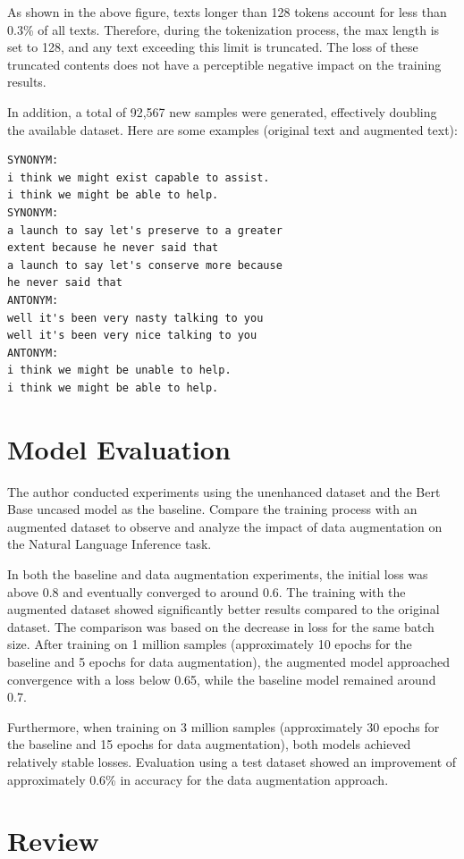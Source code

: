 \documentclass[11pt]{article}
\begin{document}
As shown in the above figure, texts longer than 128 tokens account for less than 0.3\% of all texts. Therefore, during the tokenization process, the max length is set to 128, and any text exceeding this limit is truncated. The loss of these truncated contents does not have a perceptible negative impact on the training results.

In addition, a total of 92,567 new samples were generated, effectively doubling the available dataset. Here are some examples (original text and augmented text):

\begin{verbatim}
SYNONYM:
i think we might exist capable to assist.
i think we might be able to help.
SYNONYM:
a launch to say let's preserve to a greater
extent because he never said that
a launch to say let's conserve more because
he never said that
ANTONYM:
well it's been very nasty talking to you
well it's been very nice talking to you
ANTONYM:
i think we might be unable to help.
i think we might be able to help.
\end{verbatim}


\section{Model Evaluation}

The author conducted experiments using the unenhanced dataset and the Bert Base uncased model as the baseline. Compare the training process with an augmented dataset to observe and analyze the impact of data augmentation on the Natural Language Inference task.

In both the baseline and data augmentation experiments, the initial loss was above 0.8 and eventually converged to around 0.6. The training with the augmented dataset showed significantly better results compared to the original dataset. The comparison was based on the decrease in loss for the same batch size. After training on 1 million samples (approximately 10 epochs for the baseline and 5 epochs for data augmentation), the augmented model approached convergence with a loss below 0.65, while the baseline model remained around 0.7.

Furthermore, when training on 3 million samples (approximately 30 epochs for the baseline and 15 epochs for data augmentation), both models achieved relatively stable losses. Evaluation using a test dataset showed an improvement of approximately 0.6\% in accuracy for the data augmentation approach.

\section{Review}
\end{document}
